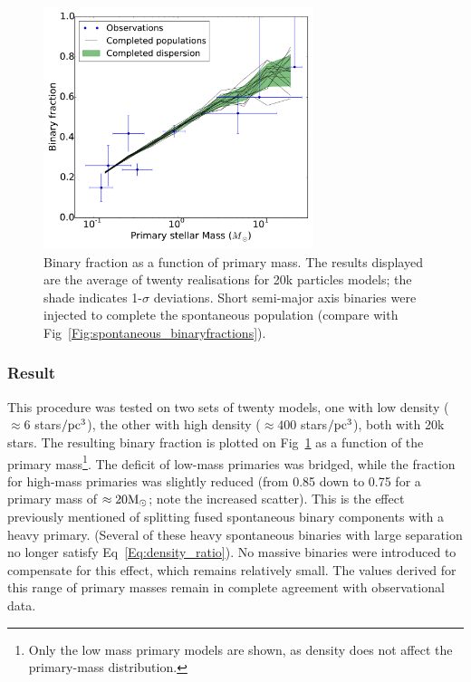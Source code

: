 


\begin{figure}
\begin{center}
\includegraphics[width=0.7\textwidth]{Figures/5_completed_primarymass}
\caption{Binary fraction as a function of primary mass. The results displayed are the average of twenty realisations for 20k particles models; the shade indicates 1-$\sigma$ deviations. Short semi-major axis binaries were injected to complete the spontaneous population (compare with Fig~\protect\ref{Fig:spontaneous_binaryfractions}).}
\label{Fig:5_completed_primarymass}
\end{center}
\end{figure}

\subsubsection*{Result}

This procedure was tested on two sets of twenty \HubLem models, one with low density ($\approx 6$ stars$/{\textrm{pc}}^3$), the other with high density ($\approx 400$ stars$/{\textrm{pc}}^3$), both with 20k stars. The resulting binary fraction is plotted on Fig~\ref{Fig:5_completed_primarymass} as a function of the primary mass\footnote{Only the low mass primary models are shown, as density does not affect the primary-mass distribution.}. The deficit of low-mass primaries was bridged, while the fraction for high-mass primaries was slightly reduced (from 0.85 down to 0.75 for a primary mass of $\approx 20 {\textrm{M}_\odot}$; note the increased scatter). This is the effect previously mentioned  of splitting fused spontaneous binary components with a heavy primary. (Several of these heavy spontaneous binaries with large separation no longer satisfy Eq~\ref{Eq:density_ratio}). No massive binaries were introduced to compensate for this effect, which remains relatively small. The values derived for this range of primary masses remain in complete agreement with observational data.


